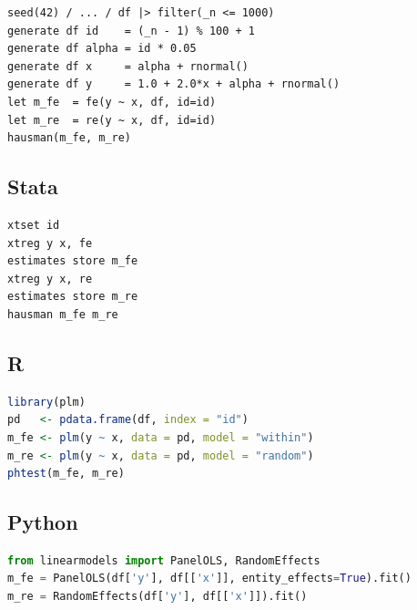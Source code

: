 \begin{lstlisting}
seed(42) / ... / df |> filter(_n <= 1000)
generate df id    = (_n - 1) % 100 + 1
generate df alpha = id * 0.05
generate df x     = alpha + rnormal()
generate df y     = 1.0 + 2.0*x + alpha + rnormal()
let m_fe  = fe(y ~ x, df, id=id)
let m_re  = re(y ~ x, df, id=id)
hausman(m_fe, m_re)
\end{lstlisting}

\subsection*{Stata}

\begin{lstlisting}[language={}, basicstyle=\ttfamily\small,
  frame=single, numbers=none, backgroundcolor=\color{codbg}]
xtset id
xtreg y x, fe
estimates store m_fe
xtreg y x, re
estimates store m_re
hausman m_fe m_re
\end{lstlisting}

\subsection*{R}

\begin{lstlisting}[language=R, basicstyle=\ttfamily\small,
  frame=single, numbers=none, backgroundcolor=\color{codbg},
  keywordstyle=\color{keyword}\bfseries,
  stringstyle=\color{string},
  commentstyle=\color{comment}\itshape]
library(plm)
pd   <- pdata.frame(df, index = "id")
m_fe <- plm(y ~ x, data = pd, model = "within")
m_re <- plm(y ~ x, data = pd, model = "random")
phtest(m_fe, m_re)
\end{lstlisting}

\subsection*{Python}

\begin{lstlisting}[language=Python, basicstyle=\ttfamily\small,
  frame=single, numbers=none, backgroundcolor=\color{codbg},
  keywordstyle=\color{keyword}\bfseries,
  stringstyle=\color{string},
  commentstyle=\color{comment}\itshape]
from linearmodels import PanelOLS, RandomEffects
m_fe = PanelOLS(df['y'], df[['x']], entity_effects=True).fit()
m_re = RandomEffects(df['y'], df[['x']]).fit()
\end{lstlisting}

